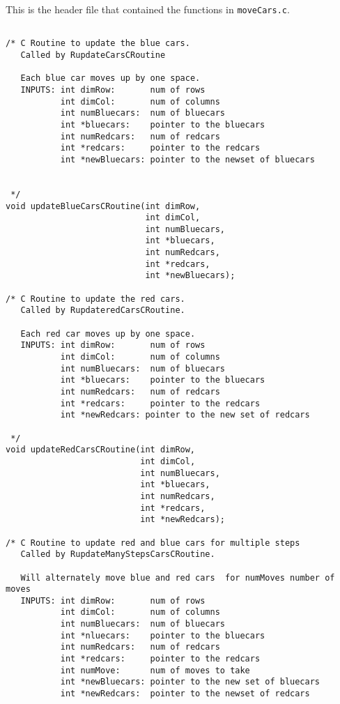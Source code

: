 \documentclass[11pt]{article}
\begin{document}
   This is the header file that contained the functions in \verb~moveCars.c~.

\begin{verbatim}

/* C Routine to update the blue cars.
   Called by RupdateCarsCRoutine

   Each blue car moves up by one space.
   INPUTS: int dimRow:       num of rows
           int dimCol:       num of columns
           int numBluecars:  num of bluecars
           int *bluecars:    pointer to the bluecars
           int numRedcars:   num of redcars
           int *redcars:     pointer to the redcars
           int *newBluecars: pointer to the newset of bluecars


 */
void updateBlueCarsCRoutine(int dimRow, 
                            int dimCol,
                            int numBluecars,
                            int *bluecars, 
                            int numRedcars,
                            int *redcars,
                            int *newBluecars);

/* C Routine to update the red cars.
   Called by RupdateredCarsCRoutine.

   Each red car moves up by one space.
   INPUTS: int dimRow:       num of rows
           int dimCol:       num of columns
           int numBluecars:  num of bluecars
           int *bluecars:    pointer to the bluecars
           int numRedcars:   num of redcars
           int *redcars:     pointer to the redcars
           int *newRedcars: pointer to the new set of redcars

 */
void updateRedCarsCRoutine(int dimRow,
                           int dimCol,
                           int numBluecars,
                           int *bluecars, 
                           int numRedcars,
                           int *redcars,
                           int *newRedcars);

/* C Routine to update red and blue cars for multiple steps
   Called by RupdateManyStepsCarsCRoutine.

   Will alternately move blue and red cars  for numMoves number of moves
   INPUTS: int dimRow:       num of rows
           int dimCol:       num of columns
           int numBluecars:  num of bluecars
           int *nluecars:    pointer to the bluecars
           int numRedcars:   num of redcars
           int *redcars:     pointer to the redcars
           int numMove:      num of moves to take
           int *newBluecars: pointer to the new set of bluecars
           int *newRedcars:  pointer to the newset of redcars


\end{verbatim}
\end{document}
